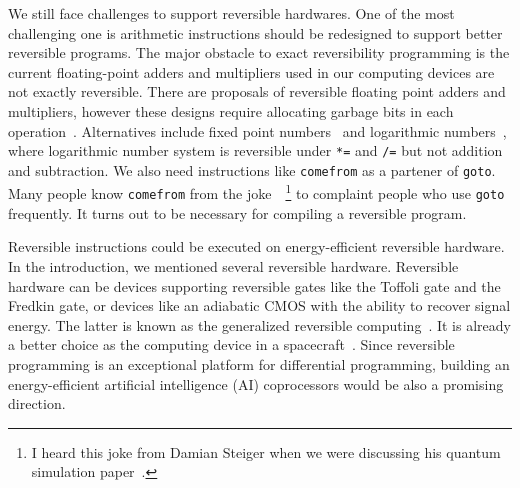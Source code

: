 \documentclass{article}
\newcommand{\<}{\langle}
\renewcommand{\>}{\rangle}
\theoremstyle{definition}\newtheorem{definition}{\textit{Definition}}
\begin{document}
We still face challenges to support reversible hardwares. One of the most challenging one is arithmetic instructions should be redesigned to support better reversible programs.
The major obstacle to exact reversibility programming is the current floating-point adders and multipliers used in our computing devices are not exactly reversible.
There are proposals of reversible floating point adders and multipliers, however these designs require allocating garbage bits in each operation~\cite{Nachtigal2010,Nachtigal2011,Nguyen2013,Hner2018}.
Alternatives include fixed point numbers~\cite{FixedPointNumbers} and logarithmic numbers~\cite{Taylor1988,LogarithmicNumbers}, where logarithmic number system is reversible under \texttt{*=} and \texttt{/=} but not addition and subtraction.
We also need instructions like \texttt{comefrom} as a partener of \texttt{goto}.
Many people know \texttt{comefrom} from the joke~\cite{COMEFROM}~\footnote{I heard this joke from Damian Steiger when we were discussing his quantum simulation paper~\cite{Haner2017}.} to complaint people who use \texttt{goto} frequently.
It turns out to be necessary for compiling a reversible program.

Reversible instructions could be executed on energy-efficient reversible hardware.
In the introduction, we mentioned several reversible hardware. Reversible hardware can be devices supporting reversible gates like the Toffoli gate and the Fredkin gate, or devices like an adiabatic CMOS with the ability to recover signal energy. The latter is known as the generalized reversible computing~\cite{Frank2005,Frank2017b}.
It is already a better choice as the computing device in a spacecraft~\cite{Debenedictis2017}.
Since reversible programming is an exceptional platform for differential programming, building an energy-efficient artificial intelligence (AI) coprocessors would be also a promising direction.
\end{document}
